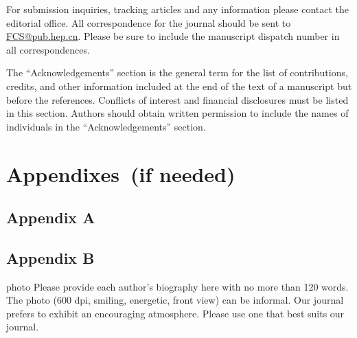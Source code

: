 \documentclass[review]{fcs}
\begin{document}
For submission inquiries, tracking articles and any information please contact the editorial office. All correspondence for the journal should be sent to \url{FCS@pub.hep.cn}. Please be sure to include the manuscript dispatch number in all correspondences.

\begin{acknowledgement}
The ``Acknowledgements'' section is the general term for the list of contributions, credits, and other information included at the end of the text of a manuscript but before the references. Conflicts of interest and financial disclosures must be listed in this section. Authors should obtain written permission to include the names of individuals in the ``Acknowledgements'' section.
\end{acknowledgement}

\section*{Appendixes~(if needed)}

\subsection*{Appendix A}

\subsection*{Appendix B}




\begin{biography}{photo}
Please provide each author's biography here with no more than 120 words. The photo (600 dpi, smiling, energetic, front view) can be informal. Our journal prefers to exhibit an encouraging atmosphere. Please use one that best suits our journal.
\end{biography}
\end{document}
